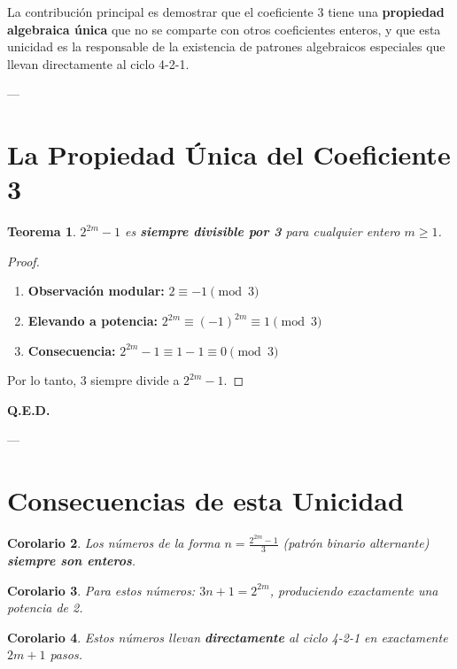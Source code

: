 \documentclass[11pt,a4paper]{article}
\newtheorem{theorem}{Teorema}[section]
\newtheorem{corollary}[theorem]{Corolario}
\begin{document}
La contribución principal es demostrar que el coeficiente 3 tiene una \textbf{propiedad algebraica única} que no se comparte con otros coeficientes enteros, y que esta unicidad es la responsable de la existencia de patrones algebraicos especiales que llevan directamente al ciclo 4-2-1.

---

\section{La Propiedad Única del Coeficiente 3}

\begin{theorem}
\label{thm:divisibilidad}
\( 2^{2m} - 1 \) es \textbf{siempre divisible por 3} para cualquier entero \( m \geq 1 \).
\end{theorem}

\begin{proof}
\begin{enumerate}
    \item \textbf{Observación modular:} \( 2 \equiv -1 \pmod{3} \)
    \item \textbf{Elevando a potencia:} \( 2^{2m} \equiv (-1)^{2m} \equiv 1 \pmod{3} \)
    \item \textbf{Consecuencia:} \( 2^{2m} - 1 \equiv 1 - 1 \equiv 0 \pmod{3} \)
\end{enumerate}
Por lo tanto, 3 siempre divide a \( 2^{2m} - 1 \).
\end{proof}

\textbf{Q.E.D.}

---

\section{Consecuencias de esta Unicidad}

\begin{corollary}
Los números de la forma \( n = \frac{2^{2m} - 1}{3} \) (patrón binario alternante) \textbf{siempre son enteros}.
\end{corollary}

\begin{corollary}
Para estos números: \( 3n + 1 = 2^{2m} \), produciendo exactamente una potencia de 2.
\end{corollary}

\begin{corollary}
Estos números llevan \textbf{directamente} al ciclo 4-2-1 en exactamente \( 2m + 1 \) pasos.
\end{corollary}
\end{document}
